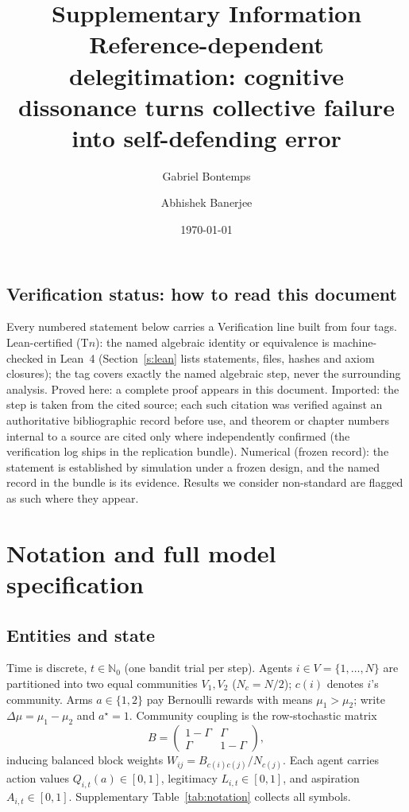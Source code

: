 \documentclass[11pt]{article}
\title{\bfseries Supplementary Information\\[1mm] \large Reference-dependent delegitimation: cognitive dissonance turns collective failure into self-defending error}
\author{Gabriel Bontemps \and Abhishek Banerjee}
\date{\today}
\newcommand{\1}{\mathbf{1}}
\begin{document}
\maketitle
\tableofcontents

\subsection*{Verification status: how to read this document}
Every numbered statement below carries a \textsf{Verification} line built from four tags.
\textsf{Lean-certified (T$n$)}: the named algebraic identity or equivalence is
machine-checked in Lean~4 (Section~\ref{s:lean} lists statements, files, hashes and axiom
closures); the tag covers exactly the named algebraic step, never the surrounding
analysis. \textsf{Proved here}: a complete proof appears in this document.
\textsf{Imported}: the step is taken from the cited source; each such citation was
verified against an authoritative bibliographic record before use, and theorem or chapter
numbers internal to a source are cited only where independently confirmed (the
verification log ships in the replication bundle). \textsf{Numerical (frozen record)}:
the statement is established by simulation under a frozen design, and the named record in
the bundle is its evidence. Results we consider non-standard are flagged as such where
they appear.

\section{Notation and full model specification}
\label{s:model}

\subsection{Entities and state}
Time is discrete, $t\in\mathbb N_0$ (one bandit trial per step). Agents $i\in V=\{1,\dots,N\}$ are partitioned into two equal communities $V_1,V_2$ ($N_c=N/2$); $c(i)$ denotes $i$'s community. Arms $a\in\{1,2\}$ pay Bernoulli rewards with means $\mu_1>\mu_2$; write $\Delta\mu=\mu_1-\mu_2$ and $a^\star=1$. Community coupling is the row-stochastic matrix
\begin{equation}
B=\begin{pmatrix}1-\Gamma & \Gamma\\ \Gamma & 1-\Gamma\end{pmatrix},
\end{equation}
inducing balanced block weights $W_{ij}=B_{c(i)c(j)}/N_{c(j)}$. Each agent carries action values $Q_{i,t}(a)\in[0,1]$, legitimacy $L_{i,t}\in[0,1]$, and aspiration $A_{i,t}\in[0,1]$. Supplementary Table~\ref{tab:notation} collects all symbols.
\end{document}
